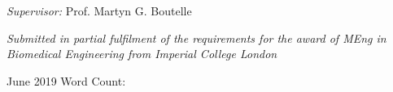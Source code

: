 \begin{titlepage}
\begin{center}
\large
\textit{Supervisor:}
Prof. Martyn G. Boutelle


\vspace{5cm}
\small
\textit{Submitted in partial fulfilment of the requirements for the award of MEng in Biomedical Engineering from Imperial College London}

\end{center}

\vspace{2.5cm}
June 2019   \hfill  Word Count:

\vfill %



\makeatother


\end{titlepage}